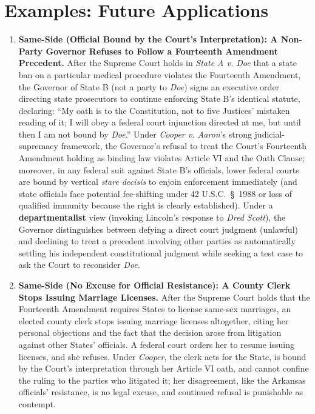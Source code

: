 \documentclass[12pt]{article}
\begin{document}
\section{Examples: Future Applications}
\begin{enumerate}

\item \textbf{Same-Side (Official Bound by the Court's Interpretation): A Non-Party Governor Refuses to Follow a Fourteenth Amendment Precedent.} After the Supreme Court holds in \textit{State A v. Doe} that a state ban on a particular medical procedure violates the Fourteenth Amendment, the Governor of State B (not a party to \textit{Doe}) signs an executive order directing state prosecutors to continue enforcing State B's identical statute, declaring: ``My oath is to the Constitution, not to five Justices' mistaken reading of it; I will obey a federal court injunction directed at me, but until then I am not bound by \textit{Doe}.'' Under \textit{Cooper v. Aaron}'s strong judicial-supremacy framework, the Governor's refusal to treat the Court's Fourteenth Amendment holding as binding law violates Article VI and the Oath Clause; moreover, in any federal suit against State B's officials, lower federal courts are bound by vertical \textit{stare decisis} to enjoin enforcement immediately (and state officials face potential fee-shifting under 42 U.S.C.\ \S~1988 or loss of qualified immunity because the right is clearly established). Under a \textbf{departmentalist} view (invoking Lincoln's response to \textit{Dred Scott}), the Governor distinguishes between defying a direct court judgment (unlawful) and declining to treat a precedent involving other parties as automatically settling his independent constitutional judgment while seeking a test case to ask the Court to reconsider \textit{Doe}.

\item \textbf{Same-Side (No Excuse for Official Resistance): A County Clerk Stops Issuing Marriage Licenses.} After the Supreme Court holds that the Fourteenth Amendment requires States to license same-sex marriages, an elected county clerk stops issuing marriage licenses altogether, citing her personal objections and the fact that the decision arose from litigation against other States' officials. A federal court orders her to resume issuing licenses, and she refuses. Under \textit{Cooper}, the clerk acts for the State, is bound by the Court's interpretation through her Article VI oath, and cannot confine the ruling to the parties who litigated it; her disagreement, like the Arkansas officials' resistance, is no legal excuse, and continued refusal is punishable as contempt.


\end{enumerate}
\end{document}
